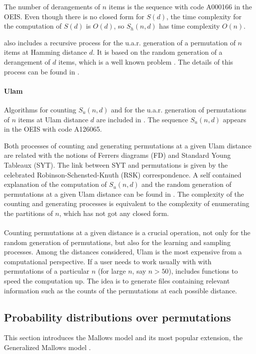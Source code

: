 \documentclass[article,nojss]{jss}
\begin{document}
The number of derangements of $n$ items is the sequence with code A000166 in the OEIS. Even though there is no closed form for $S(d)$, the time complexity for the computation of $S(d)$ is $O(d)$, so $S_h(n,d)$ has time complexity $O(n)$. 

 also includes a recursive process for the u.a.r. generation of a permutation of $n$ items at Hamming distance $d$. It is based on the random generation of a derangement of $d$ items, which is a well known problem \citep{akl02}. The details of this process can be found in \cite{Irurozki2014a}.

\paragraph{Ulam}
Algorithms for counting $S_u(n,d)$ and for the u.a.r. generation of permutations of $n$ items at Ulam distance $d$ are included in . The sequence $S_u(n,d)$ appears in the OEIS with code A126065.

Both processes of counting and generating permutations at a given Ulam distance are related with the notions of Ferrers diagrams (FD) and Standard Young Tableaux (SYT). The link between SYT and permutations is given by the celebrated  Robinson-Schensted-Knuth (RSK) correspondence. A self contained explanation of the computation of $S_u(n,d)$ and the random generation of permutations at a given Ulam distance can be found in \cite{Irurozki2014}. The complexity of the counting and generating processes is equivalent to the complexity of enumerating the partitions of $n$, which has not got any closed form.

\paragraph{}
Counting permutations at a given distance is a crucial operation, not only for the random generation of permutations, but also for the learning and sampling processes. Among the distances considered, Ulam is the most expensive from a computational perspective. If a user needs to work usually with with permutations of a particular $n$ (for large $n$, say $n>50$),  includes functions to speed the computation up. The idea is to generate files containing relevant information such as the counts of the permutations at each possible distance. 

\subsection{Probability distributions over permutations}%
\label{sec:models}
This section introduces the Mallows model \citep{mallows} and its most popular extension, the Generalized Mallows model \citep{gMallows}. 
\end{document}
